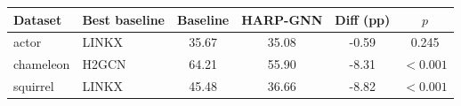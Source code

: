 \begin{tabular}{llcccc}
\toprule
Dataset & Best baseline & Baseline & HARP-GNN & Diff (pp) & $p$ \\
\midrule
actor & LINKX & 35.67 & 35.08 & -0.59 & 0.245 \\
chameleon & H2GCN & 64.21 & 55.90 & -8.31 & $<0.001$ \\
squirrel & LINKX & 45.48 & 36.66 & -8.82 & $<0.001$ \\
\bottomrule
\end{tabular}
